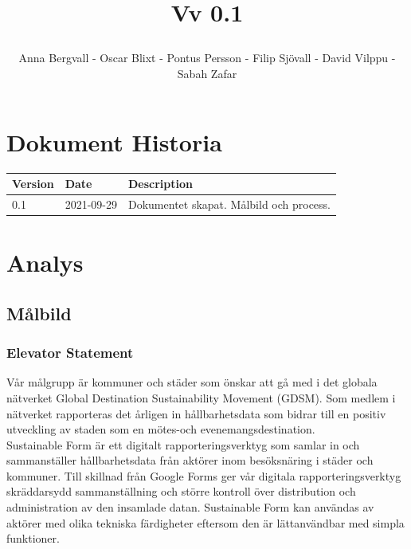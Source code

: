 \documentclass{article}
\date {#1}
\title {
    \documentNumber {01}    

    \documentTitle {Helsingborg Event and Convention Bureau}
    
    \documentDate {2021-09-29}
    \documentVersion Vv 0.1
    
    \author{Anna Bergvall - Oscar Blixt - Pontus Persson - Filip Sjövall - David Vilppu - Sabah Zafar}
}
\begin{document}
\maketitle

\thispagestyle{empty}



\newpage

\tableofcontents


\newpage

\section{Dokument Historia}
\begin{tabular}{ l | l | l }
    Version & Date & Description \\
    \hline
    0.1 & 2021-09-29 & Dokumentet skapat. Målbild och process. \\
    \hline
   
\end{tabular}

\newpage
\section{Analys}
\subsection{Målbild}
\subsubsection{Elevator Statement}


Vår målgrupp är kommuner och städer som önskar att gå med i det globala nätverket Global
Destination Sustainability Movement (GDSM). Som medlem i nätverket rapporteras det
årligen in hållbarhetsdata som bidrar till en positiv utveckling av staden som en mötes-och
evenemangsdestination. \\ \indent Sustainable Form är ett digitalt rapporteringsverktyg som samlar in
och sammanställer hållbarhetsdata från aktörer inom besöksnäring i städer och kommuner.
Till skillnad från Google Forms ger vår digitala rapporteringsverktyg skräddarsydd
sammanställning och större kontroll över distribution och administration av den insamlade
datan. Sustainable Form kan användas av aktörer med olika tekniska färdigheter eftersom den
är lättanvändbar med simpla funktioner.
\end{document}
